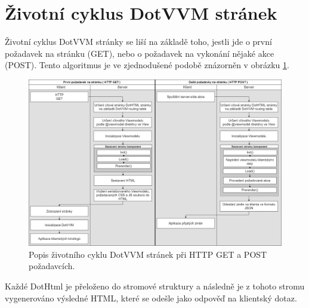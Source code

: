 \section{Životní cyklus DotVVM stránek}
\label{lifecycle}
Životní cyklus DotVVM stránky se liší na základě toho, jestli jde o první požadavek na stránku (GET), nebo o požadavek na vykonání nějaké akce (POST)\cite{DotVVM-VM}. Tento algoritmus je ve zjednodušené podobě znázorněn v obrázku \ref{Get a Post v DotVVM}.
\begin{figure}[hbt]
	\centering
	\includegraphics[width=1\textwidth]{obrazky-figures/DotVVM_lifecycle.png}\hfill
	\caption{Popis životního cyklu DotVVM stránek při HTTP GET a POST požadavcích.}
	\label{Get a Post v DotVVM}
\end{figure}

Každé DotHtml je přeloženo do stromové struktury a následně je z tohoto stromu vygenerováno výsledné HTML, které se odešle jako odpověď na klientský dotaz.

